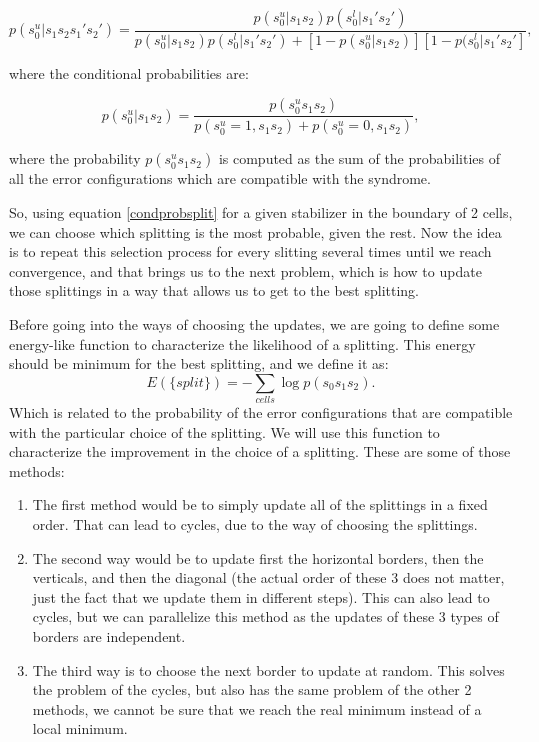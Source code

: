 \documentclass[a4paper,12pt]{article}
\begin{document}
\begin{equation}
p(s_0^u|s_1s_2s_1's_2')=\frac{p(s_0^u|s_1s_2)p(s_0^l|s_1's_2')}{p(s_0^u|s_1s_2)p(s_0^l|s_1's_2')+[1-p(s_0^u|s_1s_2)][1-p(s_0^l|s_1's_2']},
\label{condprobsplit}
\end{equation}

where the conditional probabilities are:

\begin{equation}
p(s_0^u|s_1s_2)=\frac{p(s_0^us_1s_2)}{p(s_0^u=1,s_1s_2)+p(s_0^u=0,s_1s_2)},
\end{equation}

where the probability $p(s_0^us_1s_2)$ is computed as the sum of the probabilities of all the error configurations which are compatible with the syndrome.

So, using equation \ref{condprobsplit} for a given stabilizer in the boundary of 2 cells, we can choose which splitting is the most probable, given the rest. Now the idea is to repeat this selection process for every slitting several times until we reach convergence, and that brings us to the next problem, which is how to update those splittings in a way that allows us to get to the best splitting.

Before going into the ways of choosing the updates, we are going to define some energy-like function to characterize the likelihood of a splitting. This energy should be minimum for the best splitting, and we define it as:
\begin{equation}
E(\{ split\})=-\sum_{cells} \log p(s_0s_1s_2).
\label{energyofsplitting} 
\end{equation}
Which is related to the probability of the error configurations that are compatible with the particular choice of the splitting. We will use this function to characterize the improvement in the choice of a splitting. These are some of those methods:

\begin{enumerate}
\item The first method would be to simply update all of the splittings in a fixed order. That can lead to cycles, due to the way of choosing the splittings.
\item The second way would be to update first the horizontal borders, then the verticals, and then the diagonal (the actual order of these 3 does not matter, just the fact that we update them in different steps). This can also lead to cycles, but we can parallelize this method as the updates of these 3 types of borders are independent.

\item The third way is to choose the next border to update at random. This solves the problem of the cycles, but also has the same problem of the other 2 methods, we cannot be sure that we reach the real minimum instead of a local minimum.
\end{enumerate}
\end{document}
